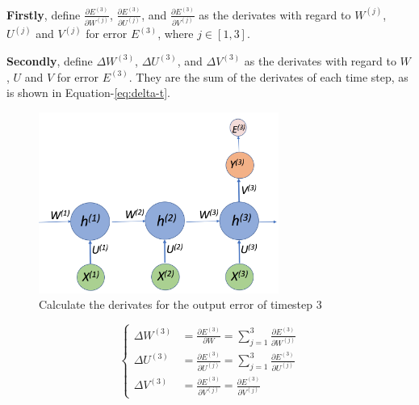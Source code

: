 \documentclass{article}
\begin{document}
\textbf{Firstly}, define $\frac{\partial E^{(3)}}{\partial W^{(j)}}$,  $\frac{\partial E^{(3)}}{\partial U^{(j)}}$, and $\frac{\partial E^{(3)}}{\partial V^{(j)}}$ as the derivates with regard to $W^{(j)}$, $U^{(j)}$ and $V^{(j)}$ for error $E^{(3)}$, where $j \in [1,3]$.

\textbf{Secondly}, define $\Delta W^{(3)}$,  $\Delta U^{(3)}$, and $\Delta V^{(3)}$ 
as the derivates with regard to $W$, $U$ and $V$ for error $E^{(3)}$. They are the sum of the derivates of each time step, as is shown in Equation-\ref{eq:delta-t}.

\begin{figure}[htbp]
	\centering
	\includegraphics[width=0.7\textwidth]{rnn-example}
	\caption{Calculate the derivates for the output error of timestep 3}
	\label{fig:step_error}
\end{figure}

\begin{equation}\label{eq:delta-t}\begin{cases}
\Delta W^{(3)} &= \frac{\partial E^{(3)}}{\partial W} = {\sum\limits_{j=1}^3}\frac{\partial E^{(3)}}{\partial W^{(j)}} \\
\Delta U^{(3)} &= \frac{\partial E^{(3)}}{\partial U^{(j)}} = {\sum\limits_{j=1}^3}\frac{\partial E^{(3)}}{\partial U^{(j)}} \\
\Delta V^{(3)} &=\frac{\partial E^{(3)}}{\partial V^{(j)}} = \frac{\partial E^{(3)}}{\partial V^{(j)} }
\end{cases}\end{equation}

 
\end{document}
